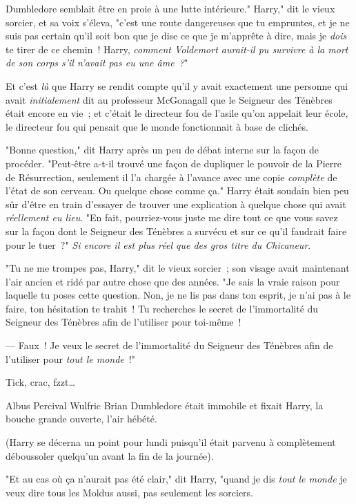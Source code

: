 Dumbledore semblait être en proie à une lutte intérieure." Harry," dit le vieux sorcier, et sa voix s'éleva, "c'est une route dangereuses que tu empruntes, et je ne suis pas certain qu'il soit bon que je dise ce que je m'apprête à dire, mais je \emph{dois} te tirer de ce chemin~! Harry, \emph{comment Voldemort aurait-il pu survivre à la mort de son corps s'il n'avait pas eu une âme~?}"

Et c'est \emph{là} que Harry se rendit compte qu'il y avait exactement une personne qui avait \emph{initialement} dit au professeur McGonagall que le Seigneur des Ténèbres était encore en vie~; et c'était le directeur fou de l'asile qu'on appelait leur école, le directeur fou qui pensait que le monde fonctionnait à base de clichés.

"Bonne question," dit Harry après un peu de débat interne sur la façon de procéder. "Peut-être a-t-il trouvé une façon de dupliquer le pouvoir de la Pierre de Résurrection, seulement il l'a chargée à l'avance avec une copie \emph{complète} de l'état de son cerveau. Ou quelque chose comme ça." Harry était soudain bien peu sûr d'être en train d'essayer de trouver une explication à quelque chose qui avait \emph{réellement eu lieu}. "En fait, pourriez-vous juste me dire tout ce que vous savez sur la façon dont le Seigneur des Ténèbres a survécu et sur ce qu'il faudrait faire pour le tuer~?" \emph{Si encore il est plus réel que des gros titre du Chicaneur}.

"Tu ne me trompes pas, Harry," dit le vieux sorcier~; son visage avait maintenant l'air ancien et ridé par autre chose que des années. "Je sais la vraie raison pour laquelle tu poses cette question. Non, je ne lis pas dans ton esprit, je n'ai pas à le faire, ton hésitation te trahit~! Tu recherches le secret de l'immortalité du Seigneur des Ténèbres afin de l'utiliser pour toi-même~!

--- Faux~! Je veux le secret de l'immortalité du Seigneur des Ténèbres afin de l'utiliser pour \emph{tout le monde}~!"

\later

Tick, crac, fzzt…

Albus Percival Wulfric Brian Dumbledore était immobile et fixait Harry, la bouche grande ouverte, l'air hébété.

(Harry se décerna un point pour lundi puisqu'il était parvenu à complètement déboussoler quelqu'un avant la fin de la journée).

"Et au cas où ça n'aurait pas été clair," dit Harry, "quand je dis \emph{tout le monde} je veux dire tous les Moldus aussi, pas seulement les sorciers.

